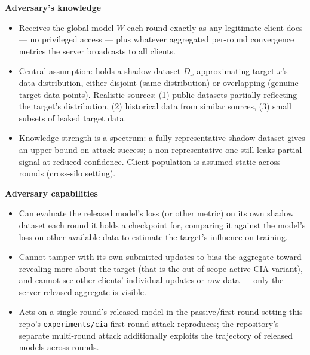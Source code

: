 \documentclass[10pt]{article}
\newcommand{\code}[1]{\texttt{\small #1}}
\begin{document}
\textbf{Adversary's knowledge}
\begin{itemize}
    \item Receives the global model $W$ each round exactly as any legitimate client does --- no
    privileged access --- plus whatever aggregated per-round convergence metrics the server
    broadcasts to all clients.
    \item Central assumption: holds a shadow dataset $D_x$ approximating target $x$'s data
    distribution, either disjoint (same distribution) or overlapping (genuine target data points).
    Realistic sources: (1) public datasets partially reflecting the target's distribution,
    (2) historical data from similar sources, (3) small subsets of leaked target data.
    \item Knowledge strength is a spectrum: a fully representative shadow dataset gives an upper
    bound on attack success; a non-representative one still leaks partial signal at reduced
    confidence. Client population is assumed static across rounds (cross-silo setting).
\end{itemize}

\textbf{Adversary capabilities}
\begin{itemize}
    \item Can evaluate the released model's loss (or other metric) on its own shadow dataset each
    round it holds a checkpoint for, comparing it against the model's loss on other available data
    to estimate the target's influence on training.
    \item Cannot tamper with its own submitted updates to bias the aggregate toward revealing more
    about the target (that is the out-of-scope active-CIA variant), and cannot see other clients'
    individual updates or raw data --- only the server-released aggregate is visible.
    \item Acts on a single round's released model in the passive/first-round setting this repo's
    \code{experiments/cia} first-round attack reproduces; the repository's separate multi-round
    attack additionally exploits the trajectory of released models across rounds.
\end{itemize}
\end{document}
